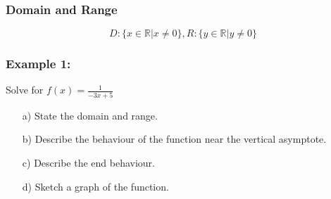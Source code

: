 \documentclass{article}
\begin{document}
\subsubsection{Domain and Range}
\begin{equation*}
    D: \{x \in \mathbb{R} | x \neq 0\}, 
    R: \{y \in \mathbb{R} | y \neq 0\} 
\end{equation*}
\subsubsection*{Example 1:}
Solve for $f(x)=\frac{1}{-3x+5}$
\begin{enumerate}
\item[a)] State the domain and range.
\item[b)] Describe the behaviour of the function near the vertical asymptote.
\item[c)] Describe the end behaviour.
\item[d)] Sketch a graph of the function.
\end{enumerate}
\end{document}
